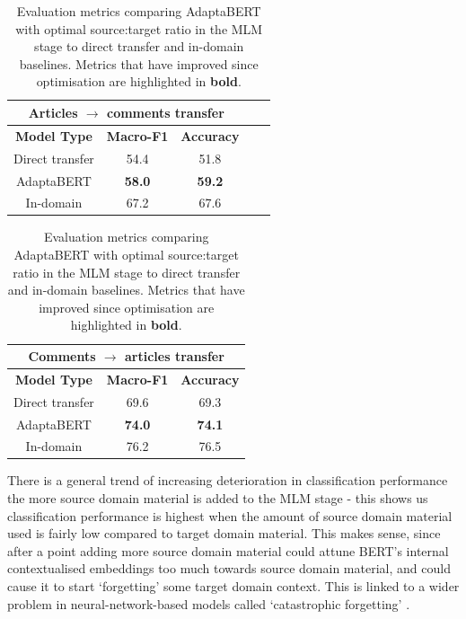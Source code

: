 \begin{table}[ht]
    \begin{center}
        \begin{tabular}{|c|c|c|c|c|}
            \hline
            \multicolumn{3}{|c|}{\textbf{Articles $ \rightarrow $ comments transfer}} \\
            \hline
            \textbf{Model Type} & \textbf{Macro-F1} & \textbf{Accuracy} \\
            \hline
            Direct transfer & 54.4 & 51.8  \\
            AdaptaBERT & \textbf{58.0} & \textbf{59.2} \\
            \hline
            In-domain & 67.2 & 67.6 \\
            \hline
        \end{tabular}
    \end{center} \vspace{10pt}
    \begin{center}
        \begin{tabular}{|c|c|c|}
            \hline
            \multicolumn{3}{|c|}{\textbf{Comments $ \rightarrow $ articles transfer}} \\
            \hline
            \textbf{Model Type} & \textbf{Macro-F1} & \textbf{Accuracy} \\
            \hline
            Direct transfer & 69.6 & 69.3  \\
            AdaptaBERT & \textbf{74.0} & \textbf{74.1} \\
            \hline
            In-domain & 76.2 & 76.5  \\
            \hline
        \end{tabular}
    \end{center}
    \caption{Evaluation metrics comparing AdaptaBERT with optimal source:target ratio in the MLM stage to direct transfer and in-domain baselines. Metrics that have improved since optimisation are highlighted in \textbf{bold}.}
    \label{tab:adaptabert-results-best}
\end{table}

There is a general trend of increasing deterioration in classification performance the more source domain material is added to the MLM stage - this shows us classification performance is highest when the amount of source domain material used is fairly low compared to target domain material. This makes sense, since after a point adding more source domain material could attune BERT's internal contextualised embeddings too much towards source domain material, and could cause it to start `forgetting' some target domain context. This is linked to a wider problem in neural-network-based models called `catastrophic forgetting' \cite{catastrophic-forgetting}.

